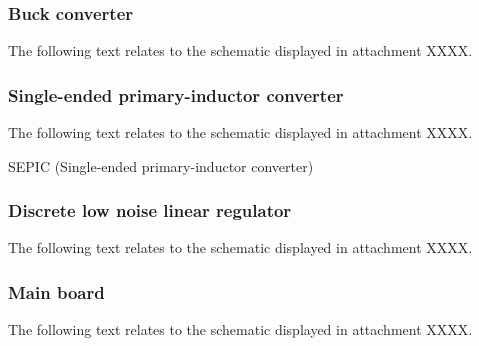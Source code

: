 \subsubsection*{Buck converter}
The following text relates to the schematic displayed in attachment XXXX.

\subsubsection*{Single-ended primary-inductor converter}
The following text relates to the schematic displayed in attachment XXXX.

SEPIC (Single-ended primary-inductor converter)

\subsubsection*{Discrete low noise linear regulator}
The following text relates to the schematic displayed in attachment XXXX.

\subsubsection*{Main board}
The following text relates to the schematic displayed in attachment XXXX.
